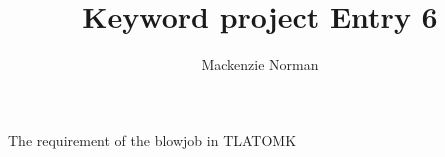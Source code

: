 \documentclass{article}
\title{Keyword project Entry 6}
\author{Mackenzie Norman}
\begin{document}
\maketitle 
The requirement of the blowjob in TLATOMK
\end{document}

